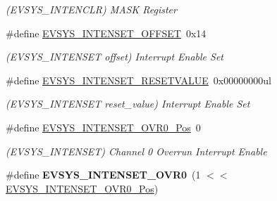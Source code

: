 \begin{DoxyCompactItemize}
\begin{DoxyCompactList}\small\item\em (E\+V\+S\+Y\+S\+\_\+\+I\+N\+T\+E\+N\+C\+L\+R) M\+A\+S\+K Register \end{DoxyCompactList}\item 
\hypertarget{group___s_a_m_l21___e_v_s_y_s_gae51b4653af060c3f6aa9f514bb919cf2}{}\#define \hyperlink{group___s_a_m_l21___e_v_s_y_s_gae51b4653af060c3f6aa9f514bb919cf2}{E\+V\+S\+Y\+S\+\_\+\+I\+N\+T\+E\+N\+S\+E\+T\+\_\+\+O\+F\+F\+S\+E\+T}~0x14\label{group___s_a_m_l21___e_v_s_y_s_gae51b4653af060c3f6aa9f514bb919cf2}

\begin{DoxyCompactList}\small\item\em (E\+V\+S\+Y\+S\+\_\+\+I\+N\+T\+E\+N\+S\+E\+T offset) Interrupt Enable Set \end{DoxyCompactList}\item 
\hypertarget{group___s_a_m_l21___e_v_s_y_s_ga108d8e09cd1437cc360dd49572ed1ebb}{}\#define \hyperlink{group___s_a_m_l21___e_v_s_y_s_ga108d8e09cd1437cc360dd49572ed1ebb}{E\+V\+S\+Y\+S\+\_\+\+I\+N\+T\+E\+N\+S\+E\+T\+\_\+\+R\+E\+S\+E\+T\+V\+A\+L\+U\+E}~0x00000000ul\label{group___s_a_m_l21___e_v_s_y_s_ga108d8e09cd1437cc360dd49572ed1ebb}

\begin{DoxyCompactList}\small\item\em (E\+V\+S\+Y\+S\+\_\+\+I\+N\+T\+E\+N\+S\+E\+T reset\+\_\+value) Interrupt Enable Set \end{DoxyCompactList}\item 
\hypertarget{group___s_a_m_l21___e_v_s_y_s_ga6671aab59c4ab79caeb81158f5a1f3e7}{}\#define \hyperlink{group___s_a_m_l21___e_v_s_y_s_ga6671aab59c4ab79caeb81158f5a1f3e7}{E\+V\+S\+Y\+S\+\_\+\+I\+N\+T\+E\+N\+S\+E\+T\+\_\+\+O\+V\+R0\+\_\+\+Pos}~0\label{group___s_a_m_l21___e_v_s_y_s_ga6671aab59c4ab79caeb81158f5a1f3e7}

\begin{DoxyCompactList}\small\item\em (E\+V\+S\+Y\+S\+\_\+\+I\+N\+T\+E\+N\+S\+E\+T) Channel 0 Overrun Interrupt Enable \end{DoxyCompactList}\item 
\hypertarget{group___s_a_m_l21___e_v_s_y_s_ga324eafbfabbeb3a0efe1d2c7ced044fa}{}\#define {\bfseries E\+V\+S\+Y\+S\+\_\+\+I\+N\+T\+E\+N\+S\+E\+T\+\_\+\+O\+V\+R0}~(1 $<$$<$ \hyperlink{group___s_a_m_l21___e_v_s_y_s_ga6671aab59c4ab79caeb81158f5a1f3e7}{E\+V\+S\+Y\+S\+\_\+\+I\+N\+T\+E\+N\+S\+E\+T\+\_\+\+O\+V\+R0\+\_\+\+Pos})\label{group___s_a_m_l21___e_v_s_y_s_ga324eafbfabbeb3a0efe1d2c7ced044fa}


\end{DoxyCompactItemize}

